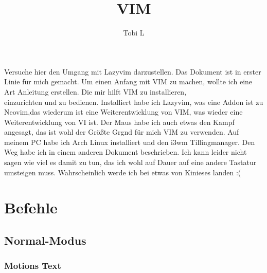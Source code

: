 \documentclass[10pt,a4paper,oneside]{report}
\author{Tobi L}
\title{VIM}
\begin{document}
\maketitle
\tableofcontents
\newpage

\begin{LARGE}
 Versuche hier den Umgang mit Lazyvim darzustellen. 
 Das Dokument ist in erster Linie für mich gemacht.
 Um einen Anfang mit VIM zu machen, wollte ich eine Art Anleitung erstellen. Die mir hilft VIM zu installieren, \\einzurichten und zu bedienen.
 Installiert habe ich Lazyvim, was eine Addon ist zu Neovim,das wiederum ist eine Weiterentwicklung von VIM, was wieder eine Weiterentwicklung von VI ist.
 Der Maus habe ich auch etwas den Kampf angesagt, das ist wohl der Größte Grgnd für mich VIM zu verwenden. Auf meinem PC habe ich Arch Linux installiert und den i3wm Tillingmanager.
 Den Weg habe ich in einem anderen Dokument beschrieben. Ich kann leider nicht sagen wie viel es damit zu tun, das ich wohl auf Dauer auf eine andere Tastatur umsteigen muss.
 Wahrscheinlich werde ich bei etwas von Kinieses landen :(
\end{LARGE}

\section{Befehle}

\subsection{Normal-Modus}

\subsubsection{Motions Text}
\end{document}
